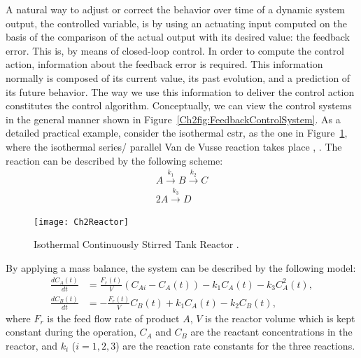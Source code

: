 A natural way to adjust or correct the behavior over time of a dynamic system output, the controlled variable, is by using an actuating input computed on the basis of the comparison of the actual output with its desired value: the feedback error. This is, by means of closed-loop control. In order to compute the control action, information about the feedback error is required. This information normally is composed of its current value, its past evolution, and a prediction of its future behavior. The way we use this information to deliver the control action constitutes the control algorithm. Conceptually, we can view the control systems in the general manner shown in Figure~\ref{Ch2fig:FeedbackControlSystem}. As a detailed  practical example, consider the isothermal \gls{cstr}, as the one in Figure~\ref{Ch2fig:CSTR}, where the isothermal series/ parallel Van de Vusse reaction takes place \citep{arrietaETFA2008}, \citep{VandeVusse2}. The reaction can be described by the following scheme:
%
\begin{align}
    A \overset{k_1}{\longrightarrow} B \overset{k_2}{\longrightarrow}C\\
    2 A \overset{k_3}{\longrightarrow} D \nonumber
\end{align}
%
%
\begin{figure}[t]
	\centering
	\texttt{[image: Ch2Reactor]}
	\caption{Isothermal Continuously Stirred Tank Reactor .} 
	\label{Ch2fig:CSTR}
\end{figure}

By applying a mass balance, the system can be described by the following model:
%
\begin{align}
    \frac{dC_A(t)}{dt} & = \frac{F_r(t)}{V} \left(C_{Ai}-C_A(t)\right) - k_1 C_A(t) - k_3 C^2_A(t),\nonumber \\
    \frac{dC_B(t)}{dt} & = -\frac{F_r(t)}{V} C_B(t)+ k_1 C_A(t) - k_2 C_B(t),
    \label{Ch2eq:system3}
\end{align}
%
where $F_r$ is the feed flow rate of product $A$, $V$ is the reactor volume which is kept constant during the operation, $C_A$ and $C_B$ are the reactant concentrations in the reactor, and $k_i$ ($i=1,2,3$) are the reaction rate constants for the three reactions.

